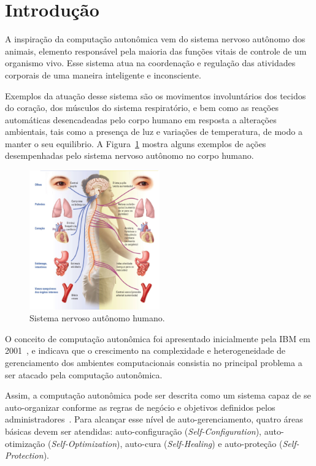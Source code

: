 \documentclass[11pt,twoside]{article}
\begin{document}
\section{Introdução}
A inspiração da computação autonômica vem do sistema nervoso autônomo dos animais, elemento responsável pela maioria das funções vitais de controle de um organismo vivo. Esse sistema atua na coordenação e regulação das atividades corporais de uma maneira inteligente e inconsciente. 

Exemplos da atuação desse sistema são os movimentos involuntários dos tecidos do coração, dos músculos do sistema respiratório, e bem como as reações automáticas desencadeadas pelo corpo humano em resposta a alterações ambientais, tais como a presença de luz e variações de temperatura, de modo a manter o seu equilibrio. A Figura~\ref{Sec:Intro:Fig1} mostra alguns exemplos de ações desempenhadas pelo sistema nervoso autônomo no corpo humano.

\begin{figure}
    \centering
    \includegraphics[width=0.5\textwidth]{Picture1.png}
    \caption{Sistema nervoso autônomo humano.}
    \label{Sec:Intro:Fig1}
\end{figure}

O conceito de computação autonômica foi apresentado inicialmente pela IBM em 2001~\cite{KEPHART}, e indicava que o crescimento na complexidade e heterogeneidade de gerenciamento dos ambientes computacionais consistia no principal problema a ser atacado pela computação autonômica. 

Assim, a computação autonômica pode ser descrita como um sistema capaz de se auto-organizar conforme as regras de negócio e objetivos definidos pelos administradores~\cite{ROMILDO}. Para alcançar esse nível de auto-gerenciamento, quatro áreas básicas devem ser atendidas: auto-configuração (\textit{Self-Configuration}), auto-otimização (\textit{Self-Optimization}), auto-cura (\textit{Self-Healing}) e auto-proteção (\textit{Self-Protection}).
\end{document}

